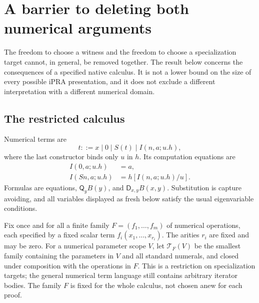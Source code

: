 \section{A barrier to deleting both numerical arguments}
\label{sec:finite-menu}

The freedom to choose a witness and the freedom to choose a specialization
target cannot, in general, be removed together.  The result below concerns
the consequences of a specified native calculus.  It is not a lower bound
on the size of every possible iPRA presentation, and it does not exclude a
different interpretation with a different numerical domain.

\subsection{The restricted calculus}

Numerical terms are
\[
 t ::= x\mid 0\mid S(t)\mid I(n,a;u.h),
\]
where the last constructor binds only $u$ in $h$.  Its computation equations
are
\begin{align*}
 I(0,a;u.h)&=a,\\
 I(Sn,a;u.h)&=h[I(n,a;u.h)/u].
\end{align*}
Formulas are equations, $\mathsf Q_y B(y)$, and
$\mathsf D_{x,y}B(x,y)$.  Substitution is capture avoiding, and all variables
displayed as fresh below satisfy the usual eigenvariable conditions.

Fix once and for all a finite family
$F=(f_1,\ldots,f_m)$ of numerical operations, each specified by a fixed
scalar term $f_i(x_1,\ldots,x_{r_i})$.  The arities $r_i$ are fixed and may
be zero.  For a numerical parameter scope $V$, let $\mathcal T_F(V)$ be the
smallest family containing the parameters in $V$ and all standard numerals,
and closed under composition with the operations in $F$.  This is a
restriction on specialization targets; the general numerical term language
still contains arbitrary iterator bodies.  The family $F$ is fixed for the
whole calculus, not chosen anew for each proof.

